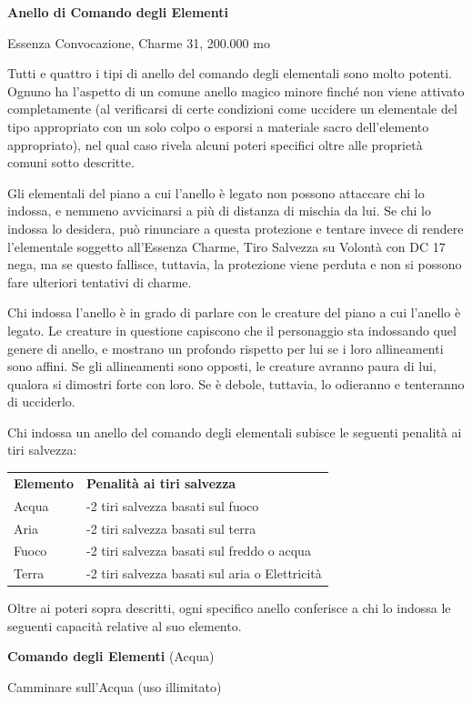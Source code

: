 \documentclass[a4paper,11pt,twoside,openany]{book}
\begin{document}
{\textbf{Anello di Comando degli Elementi}

Essenza Convocazione, Charme 31, 200.000 mo

Tutti e quattro i tipi di anello del comando degli elementali sono molto potenti. Ognuno ha l'aspetto di un comune anello magico minore finché non viene attivato completamente (al verificarsi di certe condizioni come uccidere un elementale del tipo appropriato con un solo colpo o esporsi a materiale sacro dell'elemento appropriato), nel qual caso rivela alcuni poteri specifici oltre alle proprietà comuni sotto descritte.

Gli elementali del piano a cui l'anello è legato non possono attaccare chi lo indossa, e nemmeno avvicinarsi a più di distanza di mischia da lui. Se chi lo indossa lo desidera, può rinunciare a questa protezione e tentare invece di rendere l'elementale soggetto all'Essenza Charme, Tiro Salvezza su Volontà con DC 17 nega, ma se questo fallisce, tuttavia, la protezione viene perduta e non si possono fare ulteriori tentativi di charme.

Chi indossa l'anello è in grado di parlare con le creature del piano a cui l'anello è legato. Le creature in questione capiscono che il personaggio sta indossando quel genere di anello, e mostrano un profondo rispetto per lui se i loro allineamenti sono affini. Se gli allineamenti sono opposti, le creature avranno paura di lui, qualora si dimostri forte con loro. Se è debole, tuttavia, lo odieranno e tenteranno di ucciderlo.

Chi indossa un anello del comando degli elementali subisce le seguenti
penalità ai tiri salvezza:

\begin{tabular}{ll}
\toprule
\textbf{Elemento} & \textbf{Penalità ai tiri salvezza}\tabularnewline
Acqua & -2 tiri salvezza basati sul fuoco\tabularnewline
Aria & -2 tiri salvezza basati sul terra\tabularnewline
Fuoco & -2 tiri salvezza basati sul freddo o acqua\tabularnewline
Terra & -2 tiri salvezza basati sul aria o Elettricità\tabularnewline

\end{tabular}

Oltre ai poteri sopra descritti, ogni specifico anello conferisce
a chi lo indossa le seguenti capacità relative al suo elemento.

\textbf{Comando degli Elementi} (Acqua)

Camminare sull'Acqua (uso illimitato)

}
\end{document}
